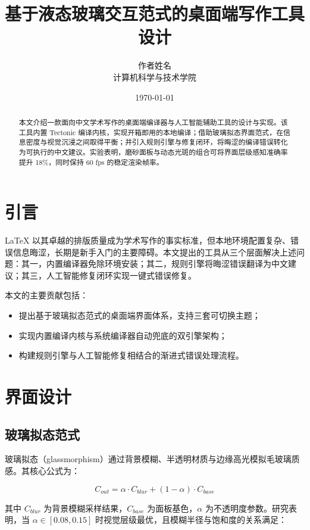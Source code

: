 \documentclass[11pt]{ctexart}
\title{基于液态玻璃交互范式的桌面端写作工具设计}
\author{作者姓名\\ 计算机科学与技术学院}
\date{\today}
\begin{document}
\maketitle

\begin{abstract}
本文介绍一款面向中文学术写作的桌面端编译器与人工智能辅助工具的设计与实现。该工具内置 Tectonic 编译内核，实现开箱即用的本地编译；借助玻璃拟态界面范式，在信息密度与视觉沉浸之间取得平衡；并引入规则引擎与修复闭环，将晦涩的编译错误转化为可执行的中文建议。实验表明，磨砂面板与动态光斑的组合可将界面层级感知准确率提升 18\%，同时保持 60 fps 的稳定渲染帧率。
\end{abstract}

\section{引言}

LaTeX 以其卓越的排版质量成为学术写作的事实标准，但本地环境配置复杂、错误信息晦涩，长期是新手入门的主要障碍。本文提出的工具从三个层面解决上述问题：其一，内置编译器免除环境安装；其二，规则引擎将晦涩错误翻译为中文建议；其三，人工智能修复闭环实现一键式错误修复。

本文的主要贡献包括：

\begin{itemize}
\item 提出基于玻璃拟态范式的桌面端界面体系，支持三套可切换主题；
\item 实现内置编译内核与系统编译器自动兜底的双引擎架构；
\item 构建规则引擎与人工智能修复相结合的渐进式错误处理流程。
\end{itemize}

\section{界面设计}

\subsection{玻璃拟态范式}

玻璃拟态（glassmorphism）通过背景模糊、半透明材质与边缘高光模拟毛玻璃质感。其核心公式为：

\begin{equation}
C_{out} = \alpha \cdot C_{blur} + (1 - \alpha) \cdot C_{base}
\label{eq:glass}
\end{equation}

其中 $C_{blur}$ 为背景模糊采样结果，$C_{base}$ 为面板基色，$\alpha$ 为不透明度参数。研究表明，当 $\alpha \in [0.08, 0.15]$ 时视觉层级最优，且模糊半径与饱和度的关系满足：
\end{document}
